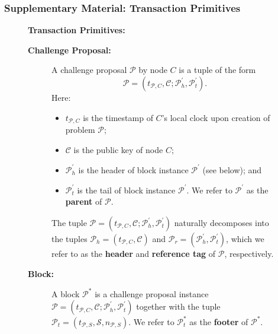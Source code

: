 \documentclass{beamer}
\begin{document}
\begin{frame}
	\frametitle{Supplementary Material: Transaction Primitives}
	\begin{figure}
		\scriptsize
		\centering
		\textbf{Transaction Primitives:} \\
		\vspace{5mm}
		\begin{description}
			\item[\textbf{Challenge Proposal:}] A challenge proposal $\mathcal{P}$ by
				node $C$ is a tuple of the form
				$$\mathcal{P}=(t_{\mathcal{P},C},\mathcal{C};\mathcal{P}^\prime_h,\mathcal{P}^\prime_t).$$
				Here:
				\begin{itemize}
					\item $t_{\mathcal{P},C}$ is the timestamp of $C$'s local clock upon
					creation of problem $\mathcal{P}$;
					\item $\mathcal{C}$ is the public key of node $C$;
					\item $\mathcal{P}^\prime_h$ is the header of block instance
					$\mathcal{P}^\prime$ (see below); and
					\item $\mathcal{P}^\prime_t$ is the tail of block instance
					$\mathcal{P}^\prime$. We refer to $\mathcal{P}^\prime$ as
					the \textbf{parent} of $\mathcal{P}$.
				\end{itemize}
				The tuple
				$\mathcal{P}=(t_{\mathcal{P},C},\mathcal{C};\mathcal{P}^\prime_h,\mathcal{P}^\prime_t)$
				naturally decomposes into the tuples
				$\mathcal{P}_h=(t_{\mathcal{P},C},\mathcal{C})$ and
				$\mathcal{P}_r=(\mathcal{P}^\prime_h,\mathcal{P}^\prime_t)$, which we
				refer to as the \textbf{header} and \textbf{reference tag} of $\mathcal{P}$,
				respectively.
			\item[\textbf{Block:}] A block $\mathcal{P}^*$ is a challenge proposal instance
				$\mathcal{P}=(t_{\mathcal{P},C},\mathcal{C};\mathcal{P}^\prime_h,\mathcal{P}^\prime_t)$
				together with the tuple $\mathcal{P}_t=(t_{\mathcal{P},S},\mathcal{S},n_{\mathcal{P},S})$.
				We refer to $\mathcal{P}^*_t$ as the \textbf{footer} of $\mathcal{P}^*$.
		\end{description}
	\end{figure}
\end{frame}
\end{document}
